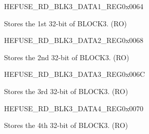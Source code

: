 \begin{register}{H}{EFUSE\_RD\_BLK3\_DATA1\_REG}{0x0064}\label{regdesc:EFUSERDBLK3DATA1REG}
%
\regnewline%
\begin{regdesc}\begin{reglist}
\label{fielddesc:EFUSEBLK3DATA1}\item [EFUSE\_BLK3\_DATA1] Stores the 1st 32-bit of BLOCK3. (RO)
\end{reglist}\end{regdesc}
\end{register}


\begin{register}{H}{EFUSE\_RD\_BLK3\_DATA2\_REG}{0x0068}\label{regdesc:EFUSERDBLK3DATA2REG}
%
\regnewline%
\begin{regdesc}\begin{reglist}
\label{fielddesc:EFUSEBLK3DATA2}\item [EFUSE\_BLK3\_DATA2] Stores the 2nd 32-bit of BLOCK3. (RO)
\end{reglist}\end{regdesc}
\end{register}


\begin{register}{H}{EFUSE\_RD\_BLK3\_DATA3\_REG}{0x006C}\label{regdesc:EFUSERDBLK3DATA3REG}
%
\regnewline%
\begin{regdesc}\begin{reglist}
\label{fielddesc:EFUSEBLK3DATA3}\item [EFUSE\_BLK3\_DATA3] Stores the 3rd 32-bit of BLOCK3. (RO)
\end{reglist}\end{regdesc}
\end{register}


\begin{register}{H}{EFUSE\_RD\_BLK3\_DATA4\_REG}{0x0070}\label{regdesc:EFUSERDBLK3DATA4REG}
%
\regnewline%
\begin{regdesc}\begin{reglist}
\label{fielddesc:EFUSEBLK3DATA4}\item [EFUSE\_BLK3\_DATA4] Stores the 4th 32-bit of BLOCK3. (RO)
\end{reglist}\end{regdesc}
\end{register}



